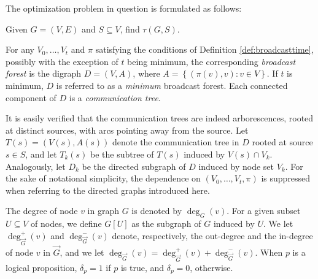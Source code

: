 The optimization problem in question is formulated as follows:
\begin{problem}\label{prob:min}
Given $G=(V,E)$ and $S\subseteq V$, find $\tau(G,S)$.
\end{problem}

\begin{definition} \label{def:broadcastgraph}
For any $V_0,\ldots,V_t$ and $\pi$ satisfying the conditions of Definition \ref{def:broadcasttime}, possibly with the exception of $t$ being minimum,
the corresponding \emph{broadcast forest} is
the digraph $D=(V,A)$, where $A=\left\{\left(\pi(v),v\right): v\in V\right\}$.
If $t$ is minimum, $D$ is referred to as a \emph{minimum} broadcast forest.
Each connected component of $D$ is a \emph{communication tree}.
\end{definition}

\noindent
It is easily verified that the communication trees are indeed arborescences, rooted at distinct sources, with arcs pointing away from the source.
Let $T(s)=\left(V(s),A(s)\right)$ denote the communication tree in $D$ rooted at source $s\in S$,
and let $T_k(s)$ be the subtree of $T(s)$ induced by $V(s)\cap V_k$.
Analogously, let $D_k$ be the directed subgraph of $D$ induced by node set $V_k$.
For the sake of notational simplicity, the dependence on $(V_0,\ldots,V_t,\pi)$ is suppressed when referring to the directed graphs introduced here.

The degree of node $v$ in graph $G$ is denoted by $\deg_G(v)$.
For a given subset $U\subseteq V$ of nodes, we define $G[U]$ as the subgraph of $G$ induced by $U$.
We let $\deg^+_{\overrightarrow{G}}(v)$ and $\deg^-_{\overrightarrow{G}}(v)$ denote, respectively, the out-degree and the in-degree of node $v$ in $\overrightarrow{G}$,
and we let $\deg_{\overrightarrow{G}}(v)=\deg_{\overrightarrow{G}}^+(v)+\deg_{\overrightarrow{G}}^-(v)$.
When $p$ is a logical proposition, $\delta_p=1$ if $p$ is true, and $\delta_p=0$, otherwise.
